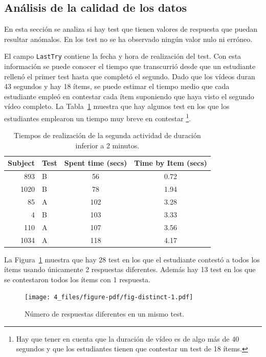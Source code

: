 \documentclass[
  12pt,
  a4paper,
  extrafontsizes,
  onecolumn,
  openright,
  table]{memoir}
\begin{document}
\hypertarget{anuxe1lisis-de-la-calidad-de-los-datos}{%
\subsection{Análisis de la calidad de los
datos}\label{anuxe1lisis-de-la-calidad-de-los-datos}}

En esta sección se analiza si hay test que tienen valores de respuesta
que puedan resultar anómalos. En los test no se ha observado ningún
valor nulo ni erróneo.

El campo \texttt{LastTry} contiene la fecha y hora de realización del
test. Con esta información se puede conocer el tiempo que transcurrió
desde que un estudiante rellenó el primer test hasta que completó el
segundo. Dado que los vídeos duran 43 segundos y hay 18 ítems, se puede
estimar el tiempo medio que cada estudiante empleó en contestar cada
ítem suponiendo que haya visto el segundo vídeo completo. La
Tabla~\ref{tbl-washout} muestra que hay algunos test en los que los
estudiantes emplearon un tiempo muy breve en contestar \footnote{Hay que
  tener en cuenta que la duración de vídeo es de algo más de 40 segundos
  y que los estudiantes tienen que contestar un test de 18 ítems.}.

\hypertarget{tbl-washout}{}
\begin{longtable}{rlcc}
\caption{\label{tbl-washout}Tiempos de realización de la segunda actividad de duración inferior a 2
minutos. }\tabularnewline

\toprule
Subject & Test & Spent time (secs) & Time by Item (secs) \\ 
\midrule
893 & B & 56 & 0.72 \\ 
1020 & B & 78 & 1.94 \\ 
85 & A & 102 & 3.28 \\ 
4 & B & 103 & 3.33 \\ 
110 & A & 107 & 3.56 \\ 
1034 & A & 118 & 4.17 \\ 
\bottomrule
\end{longtable}

La Figura~\ref{fig-distinct} muestra que hay 28 test en los que el
estudiante contestó a todos los ítems usando únicamente 2 respuestas
diferentes. Además hay 13 test en los que se contestaron todos los ítems
con 1 respuesta.

\begin{figure}[h]

{\centering \texttt{[image: 4\_files/figure-pdf/fig-distinct-1.pdf]}

}

\caption{\label{fig-distinct}Número de respuestas diferentes en un mismo
test.}

\end{figure}
\end{document}
